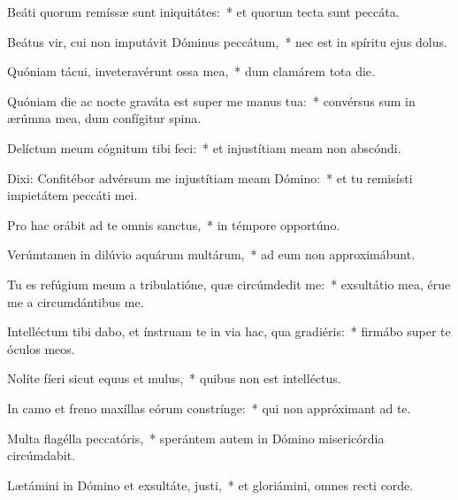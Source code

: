 \item Beáti quorum remíssæ sunt iniquitátes:~* et quorum tecta sunt peccáta.

\item Beátus vir, cui non imputávit Dóminus peccátum,~* nec est in spíritu ejus dolus.

\item Quóniam tácui, inveteravérunt ossa mea,~* dum clamárem tota die.

\item Quóniam die ac nocte graváta est super me manus tua:~* convérsus sum in ærúmna mea, dum confígitur spina.

\item Delíctum meum cógnitum tibi feci:~* et injustítiam meam non abscóndi.

\item Dixi: Confitébor advérsum me injustítiam meam Dómino:~* et tu remisísti impietátem peccáti mei.

\item Pro hac orábit ad te omnis sanctus,~* in témpore opportúno.

\item Verúmtamen in dilúvio aquárum multárum,~* ad eum non approximábunt.

\item Tu es refúgium meum a tribulatióne, quæ circúmdedit me:~* exsultátio mea, érue me a circumdántibus me.

\item Intelléctum tibi dabo, et ínstruam te in via hac, qua gradiéris:~* firmábo super te óculos meos.

\item Nolíte fíeri sicut equus et mulus,~* quibus non est intelléctus.

\item In camo et freno maxíllas eórum constrínge:~* qui non appróximant ad te.

\item Multa flagélla peccatóris,~* sperántem autem in Dómino misericórdia circúmdabit.

\item Lætámini in Dómino et exsultáte, justi,~* et gloriámini, omnes recti corde.
